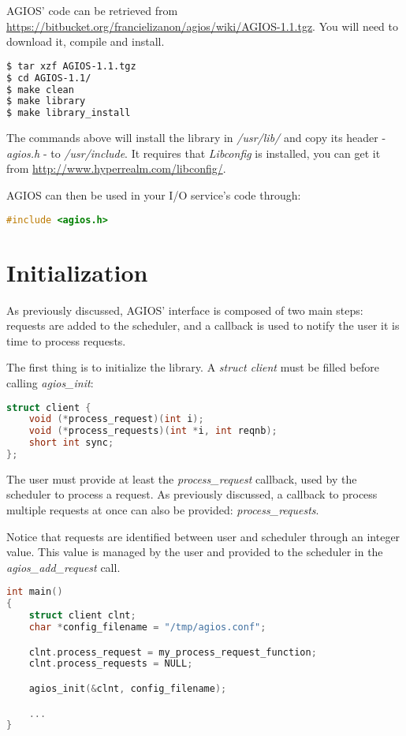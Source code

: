 AGIOS' code can be retrieved from \url{https://bitbucket.org/francielizanon/agios/wiki/AGIOS-1.1.tgz}. You will need to download it, compile and install.

\begin{lstlisting}[language=bash]
$ tar xzf AGIOS-1.1.tgz
$ cd AGIOS-1.1/
$ make clean
$ make library
$ make library_install
\end{lstlisting}

The commands above will install the library in \emph{/usr/lib/} and copy its header - \emph{agios.h} -  to \emph{/usr/include}. It requires that \emph{Libconfig} is installed, you can get it from \url{http://www.hyperrealm.com/libconfig/}. 

AGIOS can then be used in your I/O service's code through:

\begin{lstlisting}[language=C]
#include <agios.h>
\end{lstlisting}

\section{Initialization}

As previously discussed, AGIOS' interface is composed of two main steps: requests are added to the scheduler, and a callback is used to notify the user it is time to process requests. 

The first thing is to initialize the library. A \emph{struct client} must be filled before calling \emph{agios\_init}:

\begin{lstlisting}[language=C]
struct client {
	void (*process_request)(int i);
	void (*process_requests)(int *i, int reqnb);
	short int sync; 
};
\end{lstlisting}

The user must provide at least the \emph{process\_request} callback, used by the scheduler to process a request. As previously discussed, a callback to process multiple requests at once can also be provided: \emph{process\_requests}. 

Notice that requests are identified between user and scheduler through an integer value. This value is managed by the user and provided to the scheduler in the \emph{agios\_add\_request} call.

\begin{lstlisting}[language=C]
int main()
{
	struct client clnt;
	char *config_filename = "/tmp/agios.conf";

	clnt.process_request = my_process_request_function;
	clnt.process_requests = NULL;

	agios_init(&clnt, config_filename);

	...
}
\end{lstlisting}

